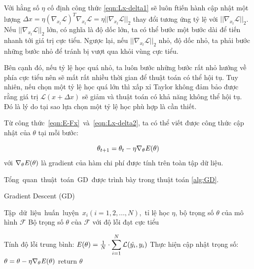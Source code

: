 Với hằng số $\eta$ cố định công thức \ref{eqn:Lx-delta1} sẽ luôn ftiến hành cập nhật một lượng $\Delta x = \eta (\nabla _{x_t}\mathcal{L})^T\nabla _{x_t}\mathcal{L} = \eta ||\nabla _{x_t}\mathcal{L}||_2$ thay đổi tương ứng tỷ lệ với $||\nabla _{x_t} \mathcal{L}||_2$. Nếu $||\nabla _{x_t} \mathcal{L}||_2$ lớn, có nghĩa là độ dốc lớn, ta có thể bước một bước dài để tiến nhanh tới giá trị cực tiểu. Ngược lại, nếu $||\nabla_{x_t} \mathcal{L}||_2$ nhỏ, độ dốc nhỏ, ta phải bước những bước nhỏ để tránh bị vượt qua khỏi vùng cực tiểu.

Bên cạnh đó, nếu tỷ lệ học quá nhỏ, ta luôn bước những bước rất nhỏ hướng về phía cực tiểu nên sẽ mất rất nhiều thời gian để thuật toán có thể hội tụ. Tuy nhiên, nếu chọn một tỷ lệ học quá lớn thì xấp xỉ Taylor không đảm bảo được rằng giá trị $\mathcal{L}(x + \Delta x)$ sẽ giảm và thuật toán có khả năng không thể hội tụ. Đó là lý do tại sao lựa chọn một tỷ lệ học phù hợp là cần thiết.

Từ công thức \ref{eqn:E-Fx} và \ref{eqn:Lx-delta2}, ta có thể viết được công thức cập nhật của $\theta$ tại mỗi bước:

\begin{equation}
	\label{eqn:theta-batch-update}
	\theta_{t+1} = \theta_ t - \eta \nabla_{\theta} \mathbf{\it{E}(\theta)}
\end{equation}
với $\nabla_\theta \mathbf{\it{E}(\theta)}$ là gradient của hàm chi phí được tính trên toàn tập dữ liệu.

Tổng quan thuật toán GD được trình bày trong thuật toán \ref{alg:GD}.

\begin{algorithm}
	\caption{Gradient Descent (GD)} \label{alg:GD}
	\begin{algorithmic}[1]
		\renewcommand{\algorithmicrequire}{\textbf{Đầu vào:}}
		\renewcommand{\algorithmicensure}{\textbf{Đầu ra:}}
		\algnewcommand{}
		\algnewcommand\Operation{\item[\algorithmicoperation]}

		\Require Tập dữ liệu huấn luyện $x_i (i = 1, 2, ..., N)$, tỉ lệ học $\eta$, bộ trọng số $\theta$ của mô hình $\mathcal{F}$
		\Ensure Bộ trọng số $\theta$ của $\mathcal{F}$ với độ lỗi đạt cực tiểu

		\Operation
			\State Tính độ lỗi trung bình: $\mathbf{\it{E}(\theta)} = \frac{1}{N}\cdot \displaystyle\sum_{i=1}^{N}\mathcal{L}(\hat{y_i}, y_i)$
			\State Thực hiện cập nhật trọng số: $\theta = \theta - \eta \nabla_{\theta} \mathbf{\it{E}(\theta)}$
		\EndWhile
		\State return $\theta$
	\end{algorithmic}
\end{algorithm}

